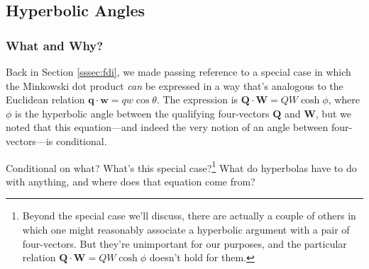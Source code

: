 \documentclass[12pt]{article}
\renewcommand{\vv}[1]{\mathbf{#1}}
\begin{document}
\subsection{Hyperbolic Angles}\label{ssec:ra}

\subsubsection{What and Why?}

Back in Section \ref{sssec:fdi}, we made passing reference to a special case in which the Minkowski dot product \emph{can} be expressed in a way that's analogous to the Euclidean relation $\vv q \cdot \vv w = qw \cos \theta$. The expression is $\vv Q \cdot \vv W = QW \cosh \phi$, where $\phi$ is the hyperbolic angle between the qualifying four-vectors $\vv Q$ and $\vv W$, but we noted that this equation---and indeed the very notion of an angle between four-vectors---is conditional.

Conditional on what? What's this special case?\footnote{Beyond the special case we'll discuss, there are actually a couple of others in which one might reasonably associate a hyperbolic argument with a pair of four-vectors. But they're unimportant for our purposes, and the particular relation $\vv Q \cdot \vv W = QW \cosh \phi$ doesn't hold for them.} What do hyperbolas have to do with anything, and where does that equation come from?
\end{document}
